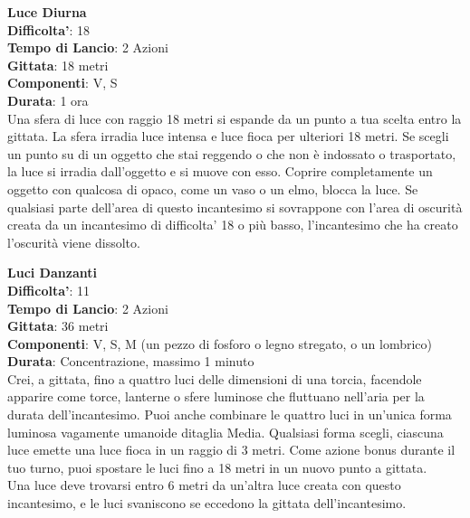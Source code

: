 \begin{multicols}{2}
\medskip\textbf{Luce Diurna}\\
\textbf{Difficolta'}: 18\\
\textbf{Tempo di Lancio}: 2 Azioni\\
\textbf{Gittata}: 18 metri\\
\textbf{Componenti}: V, S\\
\textbf{Durata}: 1 ora\\
Una sfera di luce con raggio 18 metri si espande da un punto a tua scelta entro la gittata. La sfera irradia luce intensa e luce fioca per ulteriori 18 metri. Se scegli un punto su di un oggetto che stai reggendo o che non è indossato o trasportato, la luce si irradia dall’oggetto e si muove con esso. Coprire completamente un oggetto con qualcosa di opaco, come un vaso o un elmo, blocca la luce. Se qualsiasi parte dell’area di questo incantesimo si sovrappone con l’area di oscurità creata da un incantesimo di difficolta' 18 o più basso, l’incantesimo che ha creato l’oscurità viene dissolto.

\medskip\textbf{Luci Danzanti}\\
\textbf{Difficolta'}: 11\\
\textbf{Tempo di Lancio}: 2 Azioni\\
\textbf{Gittata}: 36 metri\\
\textbf{Componenti}: V, S, M (un pezzo di fosforo o legno stregato, o un lombrico)\\
\textbf{Durata}: Concentrazione, massimo 1 minuto\\
Crei, a gittata, fino a quattro luci delle dimensioni di una torcia, facendole apparire come torce, lanterne o sfere luminose che fluttuano nell’aria per la durata dell’incantesimo. Puoi anche combinare le quattro luci in un’unica forma luminosa vagamente umanoide ditaglia Media. Qualsiasi  forma scegli, ciascuna luce emette una luce fioca in un raggio di 3 metri. Come azione bonus durante il tuo turno, puoi spostare le luci fino a 18 metri in un nuovo punto a gittata.\\
Una  luce deve trovarsi entro 6 metri da un’altra luce creata con questo incantesimo, e le luci svaniscono se eccedono la gittata dell’incantesimo. 


\end{multicols}
